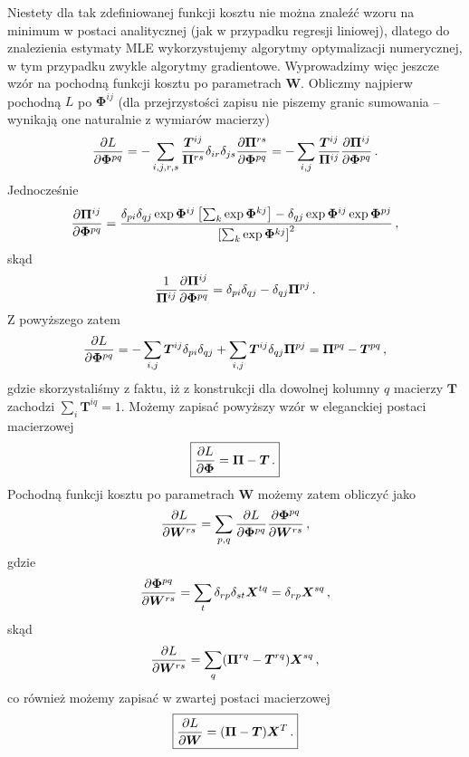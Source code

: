 \documentclass{myclass}
\numberwithin{equation}{subsection}
\begin{document}
Niestety dla tak zdefiniowanej funkcji kosztu nie można znaleźć wzoru na minimum w postaci
analitycznej (jak w przypadku regresji liniowej), dlatego do znalezienia estymaty MLE wykorzystujemy
algorytmy optymalizacji numerycznej, w tym przypadku zwykle algorytmy gradientowe. Wyprowadzimy więc
jeszcze wzór na pochodną funkcji kosztu po parametrach \(\bm{W}\). Obliczmy najpierw pochodną \(L\)
po \(\bm{\Phi}^{ij}\) (dla przejrzystości zapisu nie piszemy granic sumowania -- wynikają one
naturalnie z wymiarów macierzy)
\begin{equation}
    \pdv{L}{\bm{\Phi}^{pq}} = -\sum_{i,j,r,s} \frac{\bm{T}^{ij}}{\bm{\Pi}^{rs}}\delta_{ir}\delta_{js}\pdv{\bm{\Pi}^{rs}}{\bm{\Phi}^{pq}} = - \sum_{i,j} \frac{\bm{T}^{ij}}{\bm{\Pi}^{ij}}\pdv{\bm{\Pi}^{ij}}{\bm{\Phi}^{pq}}\,.
\end{equation}
Jednocześnie
\begin{equation}
    \pdv{\bm{\Pi}^{ij}}{\bm{\Phi}^{pq}} = \frac{\delta_{pi}\delta_{qj}\exp\bm{\Phi}^{ij}\left[\sum_k \exp\bm{\Phi}^{kj}\right] - \delta_{qj} \exp\bm{\Phi}^{ij} \exp\bm{\Phi}^{pj}}{\left[\sum_k \exp\bm{\Phi}^{kj}\right]^2}\,,
\end{equation}
skąd
\begin{equation}
    \frac{1}{\bm{\Pi}^{ij}}\pdv{\bm{\Pi}^{ij}}{\bm{\Phi}^{pq}} = \delta_{pi}\delta_{qj} - \delta_{qj}\bm{\Pi}^{pj}\,.
\end{equation}
Z powyższego zatem
\begin{equation}
    \pdv{L}{\bm{\Phi}^{pq}} = -\sum_{i,j} \bm{T}^{ij}\delta_{pi}\delta_{qj} + \sum_{i,j}\bm{T}^{ij}\delta_{qj}\bm{\Pi}^{pj} = \bm{\Pi}^{pq} - \bm{T}^{pq}\,,
\end{equation}
gdzie skorzystaliśmy z faktu, iż z konstrukcji dla dowolnej kolumny \(q\) macierzy \(\bm{T}\)
zachodzi \(\sum_{i}\bm{T}^{iq} = 1\). Możemy zapisać powyższy wzór w eleganckiej postaci macierzowej
\begin{equation}\boxed{
    \pdv{L}{\bm{\Phi}} = \bm{\Pi} - \bm{T}\,.
}\end{equation}
Pochodną funkcji kosztu po parametrach \(\bm{W}\) możemy zatem obliczyć jako
\begin{equation}
    \pdv{L}{\bm{W}^{rs}} = \sum_{p,q}\pdv{L}{\bm{\Phi}^{pq}}\pdv{\bm{\Phi}^{pq}}{\bm{W}^{rs}}\,,
\end{equation}
gdzie
\begin{equation}
    \pdv{\bm{\Phi}^{pq}}{\bm{W}^{rs}} = \sum_t \delta_{rp} \delta_{st} \bm{X}^{tq} = \delta_{rp}\bm{X}^{sq}\,,
\end{equation}
skąd
\begin{equation}
    \pdv{L}{\bm{W}^{rs}} = \sum_{q} (\bm{\Pi}^{rq} - \bm{T}^{rq}) \bm{X}^{sq}\,,
\end{equation}
co również możemy zapisać w zwartej postaci macierzowej
\begin{equation}\boxed{
    \pdv{L}{\bm{W}} = (\bm{\Pi} - \bm{T}) \bm{X}^T\,.
}\end{equation}
\end{document}
